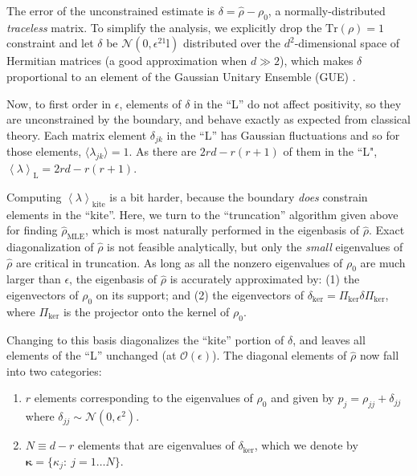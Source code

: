 \documentclass[aps,pra, twocolumn]{revtex4}
\newcommand{\Tr}{\mathrm{Tr}}
\newcommand{\expect}[1]{\ensuremath{\left\langle#1\right\rangle}}
\def\Id{1\!\mathrm{l}}
\newcommand{\bvec}[1]{\boldsymbol{#1}}
\newcommand{\rhohat}{\hat{\rho}}
\newcommand{\rhoMLE}{\rhohat_{\scriptscriptstyle\mathrm{MLE}}}
\begin{document}
The error of the unconstrained estimate is $\delta = \hat\rho- \rho_{0}$, a normally-distributed \emph{traceless} matrix.  To simplify the analysis, we explicitly drop the $\Tr(\rho)=1$ constraint and let $\delta$ be $\mathcal{N}(0,\epsilon^2\Id)$ distributed over the $d^2$-dimensional space of Hermitian matrices (a good approximation when $d\gg2$), which makes $\delta$ proportional to an element of the Gaussian Unitary Ensemble (GUE) \cite{Fyodorov2005}.  

Now, to first order in $\epsilon$, elements of $\delta$ in the ``L'' do not affect positivity, so they are unconstrained by the boundary, and behave exactly as expected from classical theory.  Each matrix element $\delta_{jk}$ in the ``L'' has Gaussian fluctuations and so for those elements, $\langle \lambda_{jk} \rangle = 1$. As there are $2rd - r(r+1)$ of them in the ``L", $\expect{\lambda}_{\mathrm{L}} = 2rd - r(r+1)$.

Computing $\expect{\lambda}_{\mathrm{kite}}$ is a bit harder, because the boundary \emph{does} constrain elements in the ``kite''.  Here, we turn to the ``truncation'' algorithm given above for finding $\rhoMLE$, which is most naturally performed in the eigenbasis of $\hat\rho$.  Exact diagonalization of $\hat\rho$ is not feasible analytically, but only the \emph{small} eigenvalues of $\hat\rho$ are critical in truncation.  As long as all the nonzero eigenvalues of $\rho_0$ are much larger than $\epsilon$, the eigenbasis of $\hat\rho$ is accurately approximated by: (1) 
the eigenvectors of $\rho_0$ on its support; and (2) the eigenvectors of $\delta_{\mathrm{ker}} = \Pi_{\mathrm{ker}}\delta\Pi_{\mathrm{ker}}$, where $\Pi_{\mathrm{ker}}
$ is the projector onto the kernel of $\rho_0$.

Changing to this basis diagonalizes the ``kite'' portion of $\delta$, and leaves all elements of the ``L'' unchanged (at $\mathcal{O}(\epsilon)$).  The diagonal elements of $\hat\rho$ now fall into two categories:
\begin{enumerate}[noitemsep]
\item $r$ elements corresponding to the eigenvalues of $\rho_0$ and given by $p_{j} = \rho_{jj} + \delta_{jj}$ where $\delta_{jj} \sim 
\mathcal{N}(0,\epsilon^2)$.
\item $N \equiv d-r$ elements that are eigenvalues of $\delta_{\mathrm{ker}}$, which we denote by $\bvec{\kappa} = \{\kappa_j:~j = 1\ldots 
N\}$.
\end{enumerate}
\end{document}
